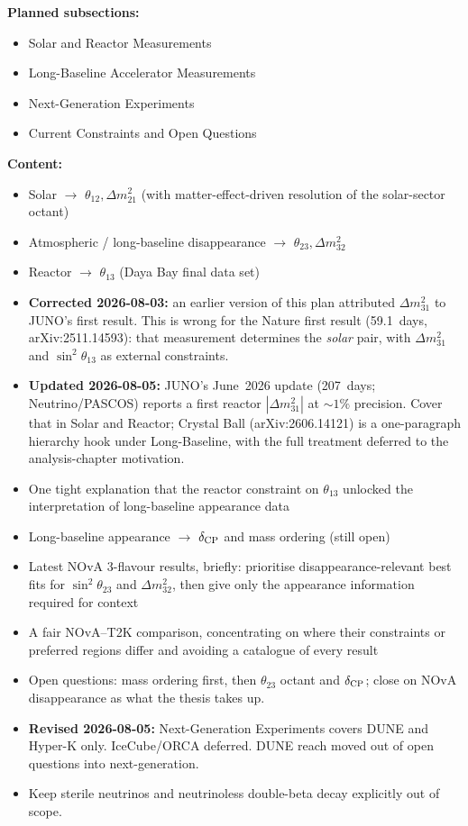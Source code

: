 \documentclass[11pt]{article}
\begin{document}
\textbf{Planned subsections:}
\begin{itemize}
    \item Solar and Reactor Measurements
    \item Long-Baseline Accelerator Measurements
    \item Next-Generation Experiments
    \item Current Constraints and Open Questions
\end{itemize}

\textbf{Content:}
\begin{itemize}
    \item Solar $\to$ $\theta_{12}, \Delta m^{2}_{21}$ (with matter-effect-driven resolution of
    the solar-sector octant)
    \item Atmospheric / long-baseline disappearance $\to$ $\theta_{23}, \Delta m^{2}_{32}$
    \item Reactor $\to$ $\theta_{13}$ (Daya Bay final data set)
    \item \textbf{Corrected 2026-08-03:} an earlier version of this plan attributed
    $\Delta m^{2}_{31}$ to JUNO's first result. This is wrong for the Nature first result
    (59.1~days, arXiv:2511.14593): that measurement determines the \emph{solar} pair, with
    $\Delta m^{2}_{31}$ and $\sin^{2}\theta_{13}$ as external constraints.
    \item \textbf{Updated 2026-08-05:} JUNO's June~2026 update (207~days; Neutrino/PASCOS)
    reports a first reactor $|\Delta m^{2}_{31}|$ at $\sim 1\%$ precision. Cover that in
    Solar and Reactor; Crystal Ball (arXiv:2606.14121) is a one-paragraph hierarchy hook
    under Long-Baseline, with the full treatment deferred to the analysis-chapter motivation.
    \item One tight explanation that the reactor constraint on $\theta_{13}$ unlocked the
    interpretation of long-baseline appearance data
    \item Long-baseline appearance $\to$ $\delta_{\rm CP}$ and mass ordering (still open)
    \item Latest NOvA 3-flavour results, briefly: prioritise disappearance-relevant best fits for
    $\sin^{2}\theta_{23}$ and $\Delta m^{2}_{32}$, then give only the appearance information
    required for context
    \item A fair NOvA--T2K comparison, concentrating on where their constraints or preferred
    regions differ and avoiding a catalogue of every result
    \item Open questions: mass ordering first, then $\theta_{23}$ octant and $\delta_{\rm CP}$;
    close on NOvA disappearance as what the thesis takes up.
    \item \textbf{Revised 2026-08-05:} Next-Generation Experiments covers DUNE and Hyper-K
    only. IceCube/ORCA deferred. DUNE reach moved out of open questions into next-generation.
    \item Keep sterile neutrinos and neutrinoless double-beta decay explicitly out of scope.
\end{itemize}
\end{document}

